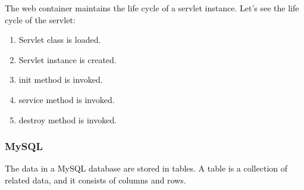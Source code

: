 \documentclass[12pt]{report}
\renewcommand{\_}{\kern-1.5pt\textunderscore\kern-1.5pt}
\begin{document}
\begin{adjustwidth}{0.3in}{0.84in}
\textcolor[HTML]{0D0D0D}{The web container maintains the life cycle of a servlet instance. Let's see the life cycle of the servlet:}\par

\end{adjustwidth}

\begin{enumerate}[label*={\fontsize{12pt}{12pt}\selectfont \arabic*.}]
	\item \textcolor[HTML]{0D0D0D}{Servlet class is loaded.}\par

	\item \textcolor[HTML]{0D0D0D}{Servlet instance is created.}\par

	\item \textcolor[HTML]{0D0D0D}{init method is invoked.}\par

	\item \textcolor[HTML]{0D0D0D}{service method is invoked.}\par

	\item \textcolor[HTML]{0D0D0D}{destroy method is invoked.}
\end{enumerate}\par

\begin{adjustwidth}{0.3in}{0.84in}
\subsubsection*{ }
\end{adjustwidth}

\begin{adjustwidth}{0.3in}{0.84in}
\subsubsection*{MySQL}
\end{adjustwidth}


\vspace{\baselineskip}
\begin{adjustwidth}{0.3in}{0.84in}
\begin{justify}
\textcolor[HTML]{0D0D0D}{The data in a MySQL database are stored in tables. A table is a collection of related data, and it consists of columns and rows.}
\end{justify}\par

\end{adjustwidth}
\end{document}
